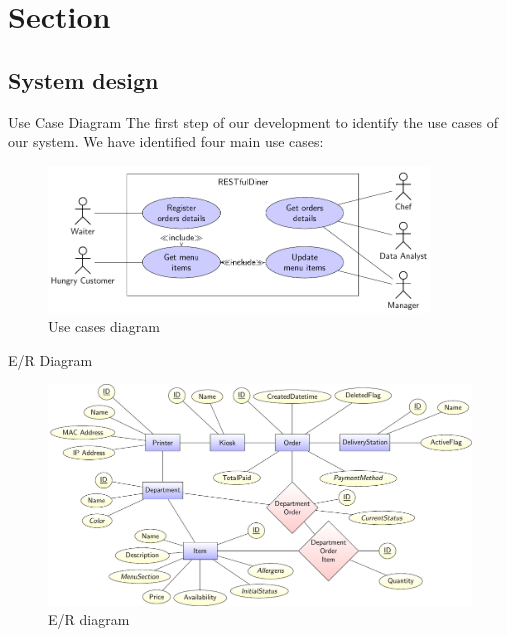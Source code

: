

\section[Section]{Section}

\subsection[Subsection]{System design}

\begin{frame}{Use Case Diagram}
	The first step of our development to identify the use cases of our system.
	We have identified four main use cases:

	\begin{figure}[h!]
		\centering
		\includegraphics[width=0.9\textwidth,height=0.75\textheight,keepaspectratio]{images/usecases}
		\caption{Use cases diagram}
		\label{fig:usecases}
	\end{figure}

\end{frame}

\begin{frame}{E/R Diagram}
	\begin{figure}[h!]
		\centering
		\includegraphics[width=\textwidth,height=0.75\textheight,keepaspectratio]{images/er}
		\caption{E/R diagram}
		\label{fig:er}
	\end{figure}

\end{frame}
